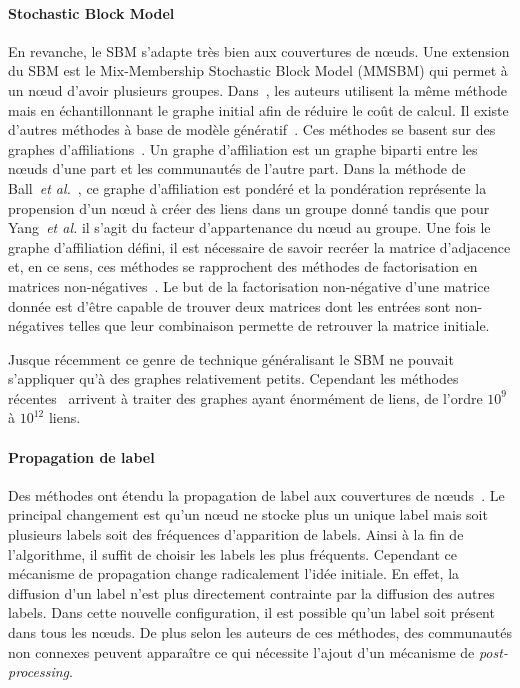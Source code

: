 \paragraph{Stochastic Block Model}
En revanche, le SBM s'adapte très bien aux couvertures de n\oe{}uds.
Une extension du SBM est le Mix-Membership Stochastic Block Model (MMSBM)\cite{Airoldi2008} qui permet à un n\oe{}ud d'avoir plusieurs groupes.
Dans~\cite{Gopalan2013a}, les auteurs utilisent la même méthode mais en échantillonnant le graphe initial afin de réduire le coût de calcul.
Il existe d'autres méthodes à base de modèle génératif~\cite{Ball2011,Yang2013}.
Ces méthodes se basent sur des graphes d'affiliations~\cite{BreigerRonald1974}.
Un graphe d'affiliation est un graphe biparti entre les n\oe{}uds d'une part et les communautés de l'autre part.
Dans la méthode de Ball~\emph{et al.}~\cite{Ball2011}, ce graphe d'affiliation est pondéré et la pondération représente la propension d'un n\oe{}ud à créer des liens dans un groupe donné tandis que pour Yang~\emph{et al.} il s'agit du facteur d'appartenance du n\oe{}ud au groupe.
Une fois le graphe d'affiliation défini, il est nécessaire de savoir recréer la matrice d'adjacence et, en ce sens, ces méthodes se rapprochent des méthodes de factorisation en matrices non-négatives~\cite{Lee1999}.
Le but de la factorisation non-négative d'une matrice donnée est d'être capable de trouver deux matrices dont les entrées sont non-négatives telles que leur combinaison permette de retrouver la matrice initiale.

Jusque récemment ce genre de technique généralisant le SBM ne pouvait s'appliquer qu'à des graphes relativement petits.
Cependant les méthodes récentes~\cite{Gopalan2013a, Yang2013} arrivent à traiter des graphes ayant énormément de liens, de l'ordre $10^{9}$ à $10^{12}$ liens.



\paragraph{Propagation de label}
Des méthodes ont étendu la propagation de label aux couvertures de n\oe{}uds~\cite{Gregory2010,Xie2011}.
Le principal changement est qu'un n\oe{}ud ne stocke plus un unique label mais soit plusieurs labels soit des fréquences d'apparition de labels.
Ainsi à la fin de l'algorithme, il suffit de choisir les labels les plus fréquents.
Cependant ce mécanisme de propagation change radicalement l'idée initiale.
En effet, la diffusion d'un label n'est plus directement contrainte par la diffusion des autres labels.
Dans cette nouvelle configuration, il est possible qu'un label soit présent dans tous les n\oe{}uds.
De plus selon les auteurs de ces méthodes, des communautés non connexes peuvent apparaître ce qui nécessite l’ajout d’un mécanisme de \emph{post-processing}.


